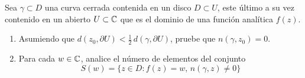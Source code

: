 \begin{exercise}
Sea $\gamma \subset D$ una curva cerrada contenida en un disco $D \subset U$, este último a su vez contenido en un abierto $U \subset \mathbb C$ que es el dominio de una función analítica $f(z)$.

\begin{enumerate}[label=(\alph*)]
    \item Asumiendo que $d(z_0, \partial U) < \frac 12 \, d(\gamma, \partial U)$, pruebe que $n(\gamma, z_0) = 0$.
    
    \item Para cada $w \in \mathbb C$, analice el número de elementos del conjunto
    $$S(w) = \{ z \in D : f(z) = w, \, n(\gamma, z) \ne 0 \}$$
\end{enumerate}
\end{exercise}

